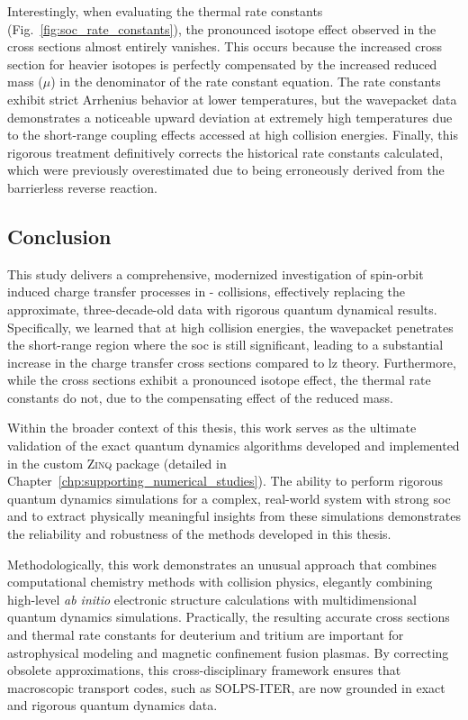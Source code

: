 Interestingly, when evaluating the thermal rate constants (Fig.~\ref{fig:soc_rate_constants}), the pronounced isotope effect observed in the cross sections almost entirely vanishes. This occurs because the increased cross section for heavier isotopes is perfectly compensated by the increased reduced mass ($\mu$) in the denominator of the rate constant equation. The rate constants exhibit strict Arrhenius behavior at lower temperatures, but the wavepacket data demonstrates a noticeable upward deviation at extremely high temperatures due to the short-range coupling effects accessed at high collision energies. Finally, this rigorous treatment definitively corrects the historical rate constants calculated, which were previously overestimated due to being erroneously derived from the barrierless reverse reaction. 
\subsection{Conclusion}
This study delivers a comprehensive, modernized investigation of spin-orbit induced charge transfer processes in - collisions, effectively replacing the approximate, three-decade-old data with rigorous quantum dynamical results. Specifically, we learned that at high collision energies, the wavepacket penetrates the short-range region where the \acrshort{soc} is still significant, leading to a substantial increase in the charge transfer cross sections compared to \acrshort{lz} theory. Furthermore, while the cross sections exhibit a pronounced isotope effect, the thermal rate constants do not, due to the compensating effect of the reduced mass.

Within the broader context of this thesis, this work serves as the ultimate validation of the exact quantum dynamics algorithms developed and implemented in the custom \textsc{Zinq} package (detailed in Chapter~\ref{chp:supporting_numerical_studies}). The ability to perform rigorous quantum dynamics simulations for a complex, real-world system with strong \acrshort{soc} and to extract physically meaningful insights from these simulations demonstrates the reliability and robustness of the methods developed in this thesis.

Methodologically, this work demonstrates an unusual approach that combines computational chemistry methods with collision physics, elegantly combining high-level \textit{ab initio} electronic structure calculations with multidimensional quantum dynamics simulations. Practically, the resulting accurate cross sections and thermal rate constants for deuterium and tritium are important for astrophysical modeling and magnetic confinement fusion plasmas. By correcting obsolete approximations, this cross-disciplinary framework ensures that macroscopic transport codes, such as SOLPS-ITER, are now grounded in exact and rigorous quantum dynamics data.\supercite{10.1088/1741-4326/adcad0}
